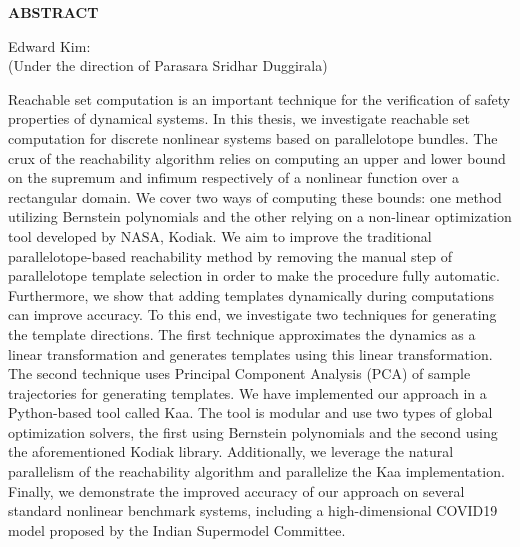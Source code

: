\begin{center}
\vspace*{52pt}
{\Large \textbf{ABSTRACT}}
\vspace{11pt}

\begin{singlespace}
Edward Kim: \thesistitle \\
(Under the direction of Parasara Sridhar Duggirala)
\end{singlespace}

\end{center}
\par Reachable set computation is an important technique for the verification of safety properties of dynamical systems.
%
%
In this thesis, we investigate reachable set computation for discrete nonlinear systems based on parallelotope bundles.
%
The crux of the reachability algorithm relies on computing an upper and lower bound on the supremum and infimum respectively of a nonlinear function over a rectangular domain.
%
We cover two ways of computing these bounds: one method utilizing Bernstein polynomials and the other relying on a non-linear optimization tool developed by NASA, Kodiak.
%
We aim to improve the traditional parallelotope-based reachability method by removing the manual step of parallelotope template selection in order to make the procedure fully automatic.
%
Furthermore, we show that adding templates dynamically during computations can improve accuracy.
%
%
%
To this end, we investigate two techniques for generating the template directions.
%
The first technique approximates the dynamics as a linear transformation and generates templates using this linear transformation.
%
The second technique uses Principal Component Analysis (PCA) of sample trajectories for generating templates.
%
We have implemented our approach in a Python-based tool called Kaa.
%
%
%
The tool is modular and use two types of global optimization solvers, the first using Bernstein polynomials and the second using
the aforementioned Kodiak library.
%
Additionally, we leverage the natural parallelism of the reachability algorithm and parallelize the Kaa implementation.
%
Finally, we demonstrate the improved accuracy of our approach on several standard nonlinear benchmark systems, including a high-dimensional COVID19 model proposed by the Indian Supermodel Committee.


\clearpage
